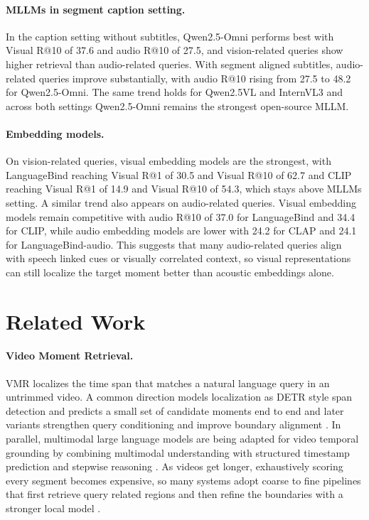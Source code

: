 \documentclass[11pt]{article}
\begin{document}


\paragraph{MLLMs in segment caption setting.}
In the caption setting without subtitles, Qwen2.5-Omni performs best with Visual R@10 of 37.6 and audio R@10 of 27.5, and vision-related queries show higher retrieval than audio-related queries.
With segment aligned subtitles, audio-related queries improve substantially, with audio R@10 rising from 27.5 to 48.2 for Qwen2.5-Omni.
The same trend holds for Qwen2.5VL and InternVL3 and across both settings Qwen2.5-Omni remains the strongest open-source MLLM.

\paragraph{Embedding models.}
On vision-related queries, visual embedding models are the strongest, with LanguageBind reaching Visual R@1 of 30.5 and Visual R@10 of 62.7 and CLIP reaching Visual R@1 of 14.9 and Visual R@10 of 54.3, which stays above MLLMs setting.
A similar trend also appears on audio-related queries. Visual embedding models remain competitive with audio R@10 of 37.0 for LanguageBind and 34.4 for CLIP, while audio embedding models are lower with 24.2 for CLAP and 24.1 for LanguageBind-audio.
This suggests that many audio-related queries align with speech linked cues or visually correlated context, so visual representations can still localize the target moment better than acoustic embeddings alone.


\section{Related Work}
\paragraph{Video Moment Retrieval.} VMR localizes the time span that matches a natural language query in an untrimmed video. 
A common direction models localization as DETR style span detection and predicts a small set of candidate moments end to end and later variants strengthen query conditioning and improve boundary alignment \cite{QVHighlights,moon2023query,lee2024bam}. In parallel, multimodal large language models are being adapted for video temporal grounding by combining multimodal understanding with structured timestamp prediction and stepwise reasoning \cite{ren2024timechat, guo2025vtg,liu2025videomind}. As videos get longer, exhaustively scoring every segment becomes expensive, so many systems adopt coarse to fine pipelines that first retrieve query related regions and then refine the boundaries with a stronger local model \cite{hou2023cone, pan2025timesearch}.
\end{document}
